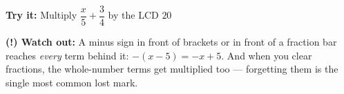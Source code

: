 \documentclass[12pt]{article}
\begin{document}
\begin{tryitbox}
\textbf{Try it:} \quad Multiply $\dfrac{x}{5} + \dfrac{3}{4}$ by the LCD $20$\\[2pt]
\end{tryitbox}

\begin{watchoutbox}
\textbf{(!) Watch out:} A minus sign in front of brackets or in front of a fraction bar reaches
\emph{every} term behind it: $-(x - 5) = -x + 5$. And when you clear fractions, the whole-number
terms get multiplied too --- forgetting them is the single most common lost mark.
\end{watchoutbox}
\end{document}
